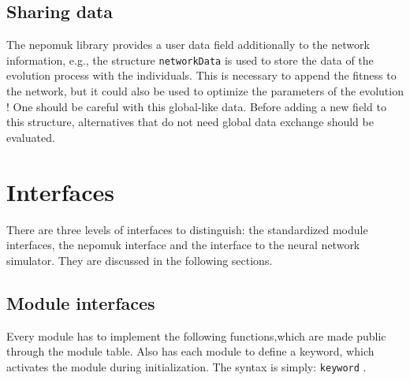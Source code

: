 \subsection{Sharing data}

The nepomuk library provides a user data field additionally to the
network information, e.g., the structure \verb+networkData+ is used
to store the data of the evolution process  with the individuals.
This is necessary to append the fitness to the network, but it could also
be used to optimize the parameters of the evolution !
One should be careful with this global-like data. Before adding a new field
to this structure, alternatives that do not need global data exchange
should be evaluated.



\section{Interfaces}

There are three levels of interfaces to distinguish:
the standardized module interfaces, the nepomuk interface and
the interface to the neural network simulator.
They are discussed in the following sections.

\subsection{Module interfaces \label{opschnitt}}

Every module has to implement the following functions,which are
made public through the module table.
Also has each module to define a keyword,
which activates the module during initialization.
The syntax is simply: \verb+keyword+ .\\

